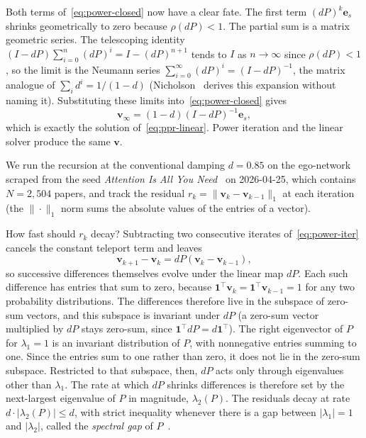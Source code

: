 \documentclass[conference]{IEEEtran}
\begin{document}
Both terms of~\eqref{eq:power-closed} now have a clear fate. The
first term $(dP)^k \mathbf{e}_s$ shrinks geometrically to zero
because $\rho(dP) < 1$. The partial sum is a matrix geometric
series. The telescoping identity $(I - dP)\sum_{i=0}^{n} (dP)^i
= I - (dP)^{n+1}$ tends to $I$ as $n \to \infty$ since
$\rho(dP) < 1$, so the limit is the Neumann series
$\sum_{i=0}^{\infty}(dP)^i = (I - dP)^{-1}$, the matrix analogue
of $\sum_i d^i = 1/(1-d)$
(Nicholson~\cite{nicholson2018linear} derives this expansion
without naming it).
Substituting these limits into~\eqref{eq:power-closed} gives
\begin{equation}
  \mathbf{v}_\infty = (1-d)(I - dP)^{-1} \mathbf{e}_s,
\end{equation}
which is exactly the solution of~\eqref{eq:ppr-linear}. Power
iteration and the linear solver produce the same $\mathbf{v}$.

We run the recursion at the conventional damping $d = 0.85$ on
the ego-network scraped from the seed \emph{Attention Is All
You Need}~\cite{vaswani2017attention} on 2026-04-25, which
contains $N = 2{,}504$ papers, and track the residual
$r_k = \|\mathbf{v}_k - \mathbf{v}_{k-1}\|_1$ at each iteration
(the $\|\cdot\|_1$ norm sums the absolute values of the entries
of a vector).

How fast should $r_k$ decay? Subtracting two consecutive iterates
of~\eqref{eq:power-iter} cancels the constant teleport term and
leaves
\begin{equation*}
  \mathbf{v}_{k+1} - \mathbf{v}_k
    = dP(\mathbf{v}_k - \mathbf{v}_{k-1}),
\end{equation*}
so successive differences themselves evolve under the linear map
$dP$. Each such difference has entries that sum to zero, because
$\mathbf{1}^\top \mathbf{v}_k = \mathbf{1}^\top \mathbf{v}_{k-1}
= 1$ for any two probability distributions. The differences
therefore live in the subspace of zero-sum vectors, and this
subspace is invariant under $dP$ (a zero-sum vector multiplied
by $dP$ stays zero-sum, since $\mathbf{1}^\top dP =
d\mathbf{1}^\top$). The right eigenvector of $P$ for $\lambda_1
= 1$ is an invariant distribution of $P$, with nonnegative
entries summing to one. Since the entries sum to one rather than
zero, it does not lie in the zero-sum subspace. Restricted to
that subspace, then, $dP$ acts only through eigenvalues other
than $\lambda_1$. The rate at which $dP$ shrinks differences is
therefore set by the next-largest eigenvalue of $P$ in
magnitude, $\lambda_2(P)$. The residuals decay at rate
$d \cdot |\lambda_2(P)| \leq d$, with strict inequality whenever
there is a gap between $|\lambda_1| = 1$ and $|\lambda_2|$,
called the \emph{spectral gap} of
$P$~\cite{langville2004deeper}.
\end{document}
